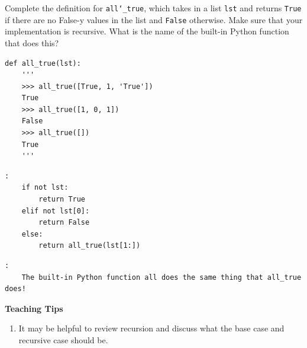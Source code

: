 \begin{blocksection}
\question Complete the definition for \texttt{all\char`_true}, which takes in a list \texttt{lst}
and returns \texttt{True} if there are no False-y values in the list and \texttt{False} otherwise.
Make sure that your implementation is recursive. What is the name of the built-in Python function that does this?

\begin{lstlisting}
def all_true(lst):
    '''
    >>> all_true([True, 1, 'True'])
    True
    >>> all_true([1, 0, 1])
    False
    >>> all_true([])
    True
    '''
\end{lstlisting}

\begin{solution}[1in]
\begin{lstlisting}:
    if not lst:
        return True
    elif not lst[0]:
        return False
    else:
        return all_true(lst[1:])
\end{lstlisting}
\begin{lstlisting}:
    The built-in Python function all does the same thing that all_true does!
\end{lstlisting}
\end{solution}

\begin{questionmeta}
    \textbf{Teaching Tips}
    \begin{enumerate}
            \item It may be helpful to review recursion and discuss what the base case and recursive case should be.
    \end{enumerate}
\end{questionmeta}
\end{blocksection}

